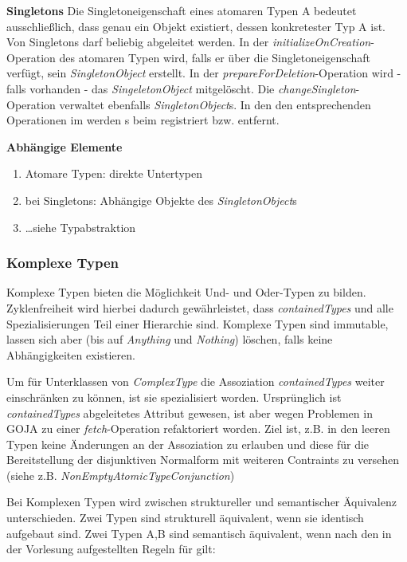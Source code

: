 \textbf{Singletons} \newline
Die Singletoneigenschaft eines atomaren Typen A bedeutet ausschließlich, dass genau ein Objekt existiert, dessen konkretester Typ A ist.
Von Singletons darf beliebig abgeleitet werden. 
In der \emph{initializeOnCreation}-Operation des atomaren Typen wird, falls er über die Singletoneigenschaft verfügt, 
sein \emph{SingletonObject} erstellt. In der \emph{prepareForDeletion}-Operation wird - falls vorhanden - das \emph{SingeletonObject}
mitgelöscht. Die \emph{changeSingleton}-Operation verwaltet ebenfalls \emph{SingletonObject}s. In den den entsprechenden Operationen im 
 werden s beim  registriert bzw. entfernt.
 
\textbf{Abhängige Elemente}
\begin{enumerate}
  		\item Atomare Typen: direkte Untertypen
  		\item bei Singletons: Abhängige Objekte des \emph{SingletonObject}s
  		\item \ldots siehe Typabstraktion
\end{enumerate}

\subsubsection{Komplexe Typen}

Komplexe Typen bieten die Möglichkeit Und- und Oder-Typen zu bilden. Zyklenfreiheit wird hierbei dadurch gewährleistet, 
dass \emph{containedTypes} und alle Spezialisierungen Teil einer Hierarchie sind. Komplexe Typen sind immutable,
lassen sich aber (bis auf \emph{Anything} und \emph{Nothing}) löschen, falls keine Abhängigkeiten existieren.


Um für Unterklassen von \emph{ComplexType} die Assoziation \emph{containedTypes} weiter einschränken zu 
können, ist sie spezialisiert worden. Ursprünglich ist \emph{containedTypes} abgeleitetes Attribut gewesen,
ist aber wegen Problemen in GOJA zu einer \emph{fetch}-Operation refaktoriert worden. 
Ziel ist, z.B. in den leeren Typen keine Änderungen an der Assoziation zu erlauben und diese für die Bereitstellung 
der disjunktiven Normalform mit weiteren Contraints zu versehen (siehe z.B. \emph{NonEmptyAtomicTypeConjunction}) 

Bei Komplexen Typen wird zwischen struktureller und semantischer Äquivalenz unterschieden. Zwei Typen sind strukturell 
äquivalent, wenn sie identisch aufgebaut sind. Zwei Typen A,B sind semantisch äquivalent, wenn nach den in der Vorlesung 
aufgestellten Regeln für  gilt: 

